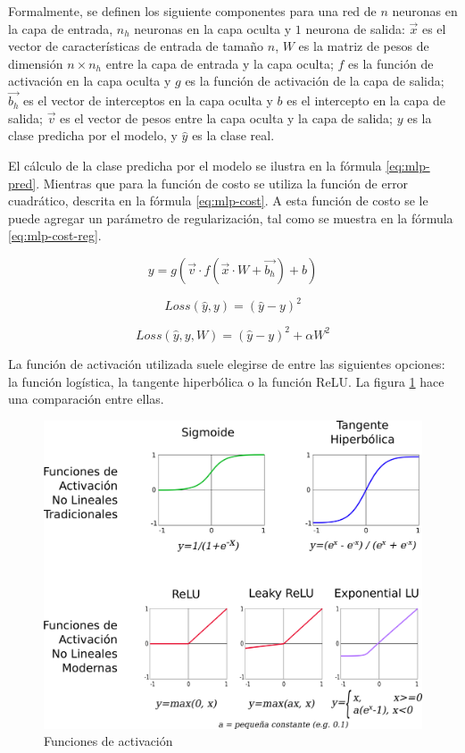Formalmente, se definen los siguiente componentes para una red de $n$ neuronas en la capa de entrada, $n_h$ neuronas en la capa oculta y $1$ neurona de salida: $\vec{x}$ es el vector de características de entrada de tamaño $n$, $W$ es la matriz de pesos de dimensión $n \times n_h$ entre la capa de entrada y la capa oculta; $f$ es la función de activación en la capa oculta y $g$ es la función de activación de la capa de salida; $\vec{b_h}$ es el vector de interceptos en la capa oculta y $b$ es el intercepto en la capa de salida; $\vec{v}$ es el vector de pesos entre la capa oculta y la capa de salida; $y$ es la clase predicha por el modelo, y $\hat{y}$ es la clase real.

El cálculo de la clase predicha por el modelo se ilustra en la fórmula \ref{eq:mlp-pred}. Mientras que para la función de costo se utiliza la función de error cuadrático, descrita en la fórmula \ref{eq:mlp-cost}. A esta función de costo se le puede agregar un parámetro de regularización, tal como se muestra en la fórmula \ref{eq:mlp-cost-reg}.

\begin{equation}
	\label{eq:mlp-pred}
	y = g(\vec{v} \cdot f(\vec{x} \cdot W + \vec{b_h}) + b)
\end{equation}

\begin{equation}
	\label{eq:mlp-cost}
	Loss(\hat{y}, y) = (\hat{y} - y)^2
\end{equation}

\begin{equation}
	\label{eq:mlp-cost-reg}
	Loss(\hat{y}, y, W) = (\hat{y} - y)^2 + \alpha W^2
\end{equation}

La función de activación utilizada suele elegirse de entre las siguientes opciones: la función logística, la tangente hiperbólica o la función \ac{ReLU}. La figura \ref{fig:mlp-activation} hace una comparación entre ellas.

\begin{figure}[htbp]
	\centering
	\includegraphics[width=0.8\linewidth]{graficos/propios/funciones_de_activacion.png}
	\caption{Funciones de activación \citep{sze2017efficient}}
	\label{fig:mlp-activation}
\end{figure}

